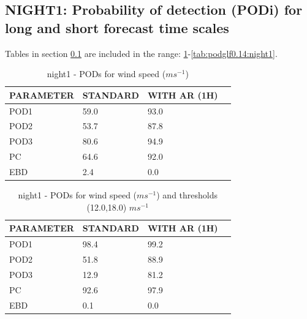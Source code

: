 \subsection{NIGHT1: Probability of detection (PODi) for long and short forecast time scales}\label{subsec:night1:pod}
Tables in section \ref{subsec:night1:pod} are included in the range: \ref{tab:podws:night1}-\ref{tab:podglf0.14:night1}.
\begin{table}[h!]
\begin{center}
\begin{tabular}{|l|l|l|l|}
\hline
\multicolumn{1}{|c|}{\cellcolor[HTML]{C0C0C0}\textbf{PARAMETER}} & \multicolumn{1}{c|}{\cellcolor[HTML]{C0C0C0}\textbf{STANDARD}} & \multicolumn{1}{c|}{\cellcolor[HTML]{C0C0C0}\textbf{WITH AR (1H)}} \\
\hline
\cellcolor[HTML]{C0C0C0}POD1  & 59.0                                & 93.0         \\
\cellcolor[HTML]{C0C0C0}POD2  & 53.7                                & 87.8         \\
\cellcolor[HTML]{C0C0C0}POD3  & 80.6                                & 94.9         \\
\cellcolor[HTML]{C0C0C0}PC    & 64.6                                  & 92.0           \\
\cellcolor[HTML]{C0C0C0}EBD   & 2.4                                 & 0.0          \\
\hline
\end{tabular}
\caption{night1 - PODs for wind speed ($m s^{-1}$)}
\label{tab:podws:night1}
\end{center}
\end{table}
\begin{table}[h!]
\begin{center}
\begin{tabular}{|l|l|l|l|}
\hline
\multicolumn{1}{|c|}{\cellcolor[HTML]{C0C0C0}\textbf{PARAMETER}} & \multicolumn{1}{c|}{\cellcolor[HTML]{C0C0C0}\textbf{STANDARD}} & \multicolumn{1}{c|}{\cellcolor[HTML]{C0C0C0}\textbf{WITH AR (1H)}} \\
\hline
\cellcolor[HTML]{C0C0C0}POD1  & 98.4   & 99.2         \\
\cellcolor[HTML]{C0C0C0}POD2  & 51.8   & 88.9         \\
\cellcolor[HTML]{C0C0C0}POD3  & 12.9   & 81.2         \\
\cellcolor[HTML]{C0C0C0}PC    & 92.6     & 97.9           \\
\cellcolor[HTML]{C0C0C0}EBD   & 0.1    & 0.0          \\
\hline
\end{tabular}
\caption{night1 - PODs for wind speed ($m s^{-1}$) and thresholds (12.0,18.0) $m s^{-1}$}
\label{tab:podwsFT:night1}
\end{center}
\end{table}
